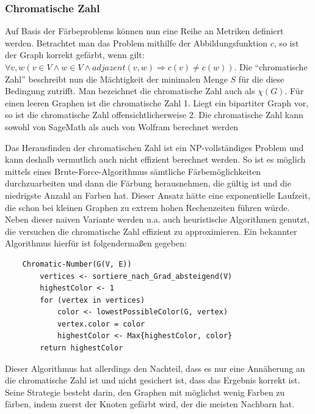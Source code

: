 \documentclass[a4paper,12pt,ngerman,chapterprefix=false,listof=totoc,bibliography=totoc]{scrreprt}
\begin{document}
\subsubsection*{Chromatische Zahl}
{
Auf Basis der Färbeproblems können nun eine Reihe an Metriken definiert werden. Betrachtet man das Problem mithilfe der Abbildungsfunktion \(c\), so ist der Graph korrekt gefärbt, wenn gilt: \(\forall v, w (v\in V\land w\in V \land adjazent(v, w)\Rightarrow c(v)\neq c(w))\). Die "`chromatische Zahl"' beschreibt nun die Mächtigkeit der minimalen Menge \(S\) für die diese Bedingung zutrifft. Man bezeichnet die chromatische Zahl auch als \(\chi (G)\). Für einen leeren Graphen ist die chromatische Zahl 1. Liegt ein bipartiter Graph vor, so ist die chromatische Zahl offensichtlicherweise 2. \cite{diestel_graphentheorie_2000} Die chromatische Zahl kann sowohl von SageMath als auch von Wolfram berechnet werden \cite{sagemath_graph_2020-1,wolfram_wolfram_2020-1}

Das Herausfinden der chromatischen Zahl ist ein NP-vollständiges Problem und kann deshalb vermutlich auch nicht effizient berechnet werden. \cite{weisstein_chromatic_nodate,karp_reducibility_1996} So ist es möglich mittels eines Brute-Force-Algorithmus sämtliche Färbemöglichkeiten durchzuarbeiten und dann die Färbung herausnehmen, die gültig ist und die niedrigste Anzahl an Farben hat. Dieser Ansatz hätte eine exponentielle Laufzeit, die schon bei kleinen Graphen zu extrem hohen Rechenzeiten führen würde. Neben dieser naiven Variante werden u.a. auch heuristische Algorithmen genutzt, die versuchen die chromatische Zahl effizient zu approximieren. Ein bekannter Algorithmus hierfür ist folgendermaßen gegeben:
\begin{lstlisting}
	Chromatic-Number(G(V, E))
		vertices <- sortiere_nach_Grad_absteigend(V)
		highestColor <- 1
		for (vertex in vertices)
			color <- lowestPossibleColor(G, vertex)
			vertex.color = color
			highestColor <- Max{highestColor, color}
		return highestColor
\end{lstlisting}
Dieser Algorithmus hat allerdings den Nachteil, dass es nur eine Annäherung an die chromatische Zahl ist und nicht gesichert ist, dass das Ergebnis korrekt ist. Seine Strategie besteht darin, den Graphen mit möglichst wenig Farben zu färben, indem zuerst der Knoten gefärbt wird, der die meisten Nachbarn hat. 
}
\end{document}
